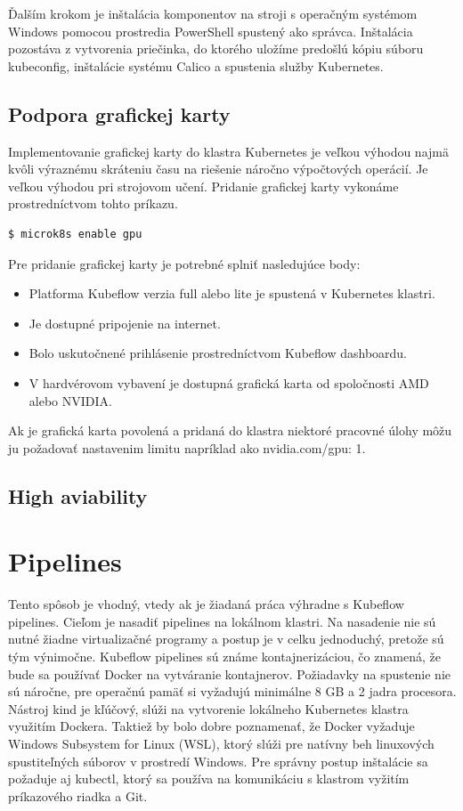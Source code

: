 Ďalším krokom je inštalácia komponentov na stroji s operačným systémom Windows pomocou prostredia PowerShell spustený ako správca. Inštalácia pozostáva z vytvorenia priečinka, do ktorého uložíme predošlú kópiu súboru kubeconfig, inštalácie systému Calico a spustenia služby Kubernetes.

\subsection{Podpora grafickej karty}

Implementovanie grafickej karty do klastra Kubernetes je veľkou výhodou najmä kvôli výraznému skráteniu času na riešenie náročno výpočtových operácií. Je veľkou výhodou pri strojovom učení. Pridanie grafickej karty vykonáme prostredníctvom tohto príkazu.

\begin{lstlisting}[language=Bash]
    $ microk8s enable gpu
    \end{lstlisting}

Pre pridanie grafickej karty je potrebné splniť nasledujúce body:

\begin{itemize}
    \item Platforma Kubeflow verzia full alebo lite je spustená v Kubernetes klastri.
    \item Je dostupné pripojenie na internet.
    \item Bolo uskutočnené prihlásenie prostredníctvom Kubeflow dashboardu.
    \item V hardvérovom vybavení je dostupná grafická karta od spoločnosti AMD alebo NVIDIA.
\end{itemize}

Ak je grafická karta povolená a pridaná do klastra niektoré pracovné úlohy môžu ju požadovať nastavenim limitu napríklad ako nvidia.com/gpu: 1.

\subsection{High aviability}

\section{Pipelines}

Tento spôsob je vhodný, vtedy ak je žiadaná práca výhradne s Kubeflow pipelines. Cieľom je nasadiť pipelines na lokálnom klastri. Na nasadenie nie sú nutné žiadne virtualizačné programy a postup je v celku jednoduchý, pretože sú tým výnimočne. Kubeflow pipelines sú známe kontajnerizáciou, čo znamená, že bude sa používať Docker na vytváranie kontajnerov. Požiadavky na spustenie nie sú náročne, pre operačnú pamäť si vyžadujú minimálne 8 GB a 2 jadra procesora. Nástroj kind je kľúčový, slúži na vytvorenie lokálneho Kubernetes klastra využitím Dockera. Taktiež by bolo dobre poznamenať, že Docker vyžaduje Windows Subsystem for Linux (WSL), ktorý slúži pre natívny beh linuxových spustiteľných súborov v prostredí Windows. Pre správny postup inštalácie sa požaduje aj kubectl, ktorý sa používa na komunikáciu s klastrom vyžitím príkazového riadka a Git.

